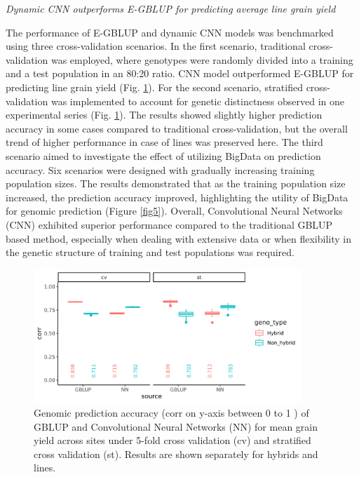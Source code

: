 \documentclass[english, biblatex]{lni}
\begin{document}
\textit{Dynamic CNN outperforms E-GBLUP for predicting average line grain yield} 

The performance of E-GBLUP and dynamic CNN models was benchmarked using three cross-validation scenarios. In the first scenario, traditional cross-validation was employed, where genotypes were randomly divided into a training and a test population in an 80:20 ratio. CNN model outperformed E-GBLUP for predicting line grain yield (Fig. \ref{fig_pred_corr_res_NN_2}). For the second scenario, stratified cross-validation was implemented to account for genetic distinctness observed in one experimental series (Fig. \ref{fig_pred_corr_res_NN_2}). The results showed slightly higher prediction accuracy in some cases compared to traditional cross-validation, but the overall trend of higher performance in case of lines was preserved here. The third scenario aimed to investigate the effect of utilizing BigData on prediction accuracy. Six scenarios were designed with gradually increasing training population sizes. The results demonstrated that as the training population size increased, the prediction accuracy improved, highlighting the utility of BigData for genomic prediction (Figure \ref{fig5}). Overall, Convolutional Neural Networks (CNN) exhibited superior performance compared to the traditional GBLUP based method, especially when dealing with extensive data or when flexibility in the genetic structure of training and test populations was required.

\begin{figure}[h]
    \centering
    \includegraphics[width=0.9\textwidth]{pred_corr_res_NN_2}
    \caption{Genomic prediction accuracy (corr on y-axis between 0 to 1 ) of GBLUP and Convolutional Neural Networks (NN) for mean grain yield across sites under 5-fold cross validation (cv) and stratified cross validation (st). Results are shown separately for hybrids and lines.}
    \label{fig_pred_corr_res_NN_2}
\end{figure}
\end{document}
